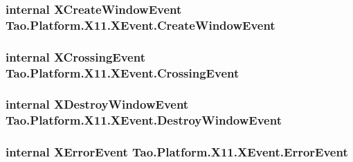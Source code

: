 \label{struct_tao_1_1_platform_1_1_x11_1_1_x_event_a6cf87b10fd4c8d72fa5db542e58dce7f}
\hypertarget{struct_tao_1_1_platform_1_1_x11_1_1_x_event_a8789b53b13f22648921b32c5aa980ebb}{
\subsubsection[{CreateWindowEvent}]{\setlength{\rightskip}{0pt plus 5cm}internal {\bf XCreateWindowEvent} {\bf Tao.Platform.X11.XEvent.CreateWindowEvent}}}
\label{struct_tao_1_1_platform_1_1_x11_1_1_x_event_a8789b53b13f22648921b32c5aa980ebb}
\hypertarget{struct_tao_1_1_platform_1_1_x11_1_1_x_event_a0ec40c6f34177e4089a3d87f33958f78}{
\subsubsection[{CrossingEvent}]{\setlength{\rightskip}{0pt plus 5cm}internal {\bf XCrossingEvent} {\bf Tao.Platform.X11.XEvent.CrossingEvent}}}
\label{struct_tao_1_1_platform_1_1_x11_1_1_x_event_a0ec40c6f34177e4089a3d87f33958f78}
\hypertarget{struct_tao_1_1_platform_1_1_x11_1_1_x_event_a232cbc90617d2dcc21ef41a94962a273}{
\subsubsection[{DestroyWindowEvent}]{\setlength{\rightskip}{0pt plus 5cm}internal {\bf XDestroyWindowEvent} {\bf Tao.Platform.X11.XEvent.DestroyWindowEvent}}}
\label{struct_tao_1_1_platform_1_1_x11_1_1_x_event_a232cbc90617d2dcc21ef41a94962a273}
\hypertarget{struct_tao_1_1_platform_1_1_x11_1_1_x_event_a96a555129f1f8b1982ac3ff7f6a0679b}{
\subsubsection[{ErrorEvent}]{\setlength{\rightskip}{0pt plus 5cm}internal {\bf XErrorEvent} {\bf Tao.Platform.X11.XEvent.ErrorEvent}}}
